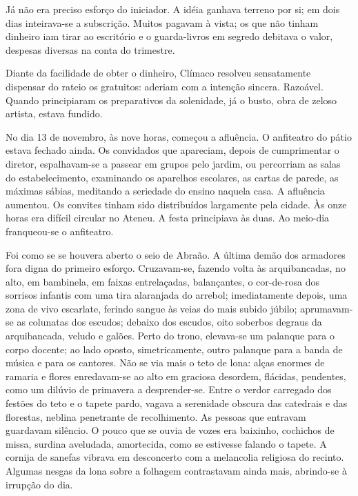 Já não era preciso esforço do
iniciador. A idéia ganhava terreno por si; em dois dias inteirava{}-se
a subscrição. Muitos pagavam à vista; os que não tinham dinheiro iam
tirar ao escritório e o guarda{}-livros em segredo debitava o valor,
despesas diversas na conta do trimestre. 

Diante da facilidade de obter
o dinheiro, Clímaco resolveu sensatamente dispensar do rateio os
gratuitos: aderiam com a intenção sincera. Razoável. Quando
principiaram os preparativos da solenidade, já o busto, obra de zeloso
artista, estava fundido. 

No dia 13 de novembro, às nove horas, começou
a afluência. O anfiteatro do pátio estava fechado ainda. Os convidados
que apareciam, depois de cumprimentar o diretor, espalhavam{}-se a
passear em grupos pelo jardim, ou percorriam as salas do
estabelecimento, examinando os aparelhos escolares, as cartas de
parede, as máximas sábias, meditando a seriedade do ensino naquela
casa. A afluência aumentou. Os convites tinham sido distribuídos
largamente pela cidade. Às onze horas era difícil circular no Ateneu. 
A festa principiava às duas. Ao meio{}-dia franqueou{}-se o anfiteatro.

Foi como se se houvera aberto o seio de Abraão. A última demão dos
armadores fora digna do primeiro esforço. Cruzavam{}-se, fazendo volta
às arquibancadas, no alto, em bambinela, em faixas entrelaçadas,
balançantes, o cor{}-de{}-rosa dos sorrisos infantis com uma tira
alaranjada do arrebol; imediatamente depois, uma zona de vivo
escarlate, ferindo sangue às veias do mais subido júbilo;
aprumavam{}-se as colunatas dos escudos; debaixo dos escudos, oito
soberbos degraus da arquibancada, veludo e galões. Perto do trono,
elevava{}-se um palanque para o corpo docente; ao lado oposto,
simetricamente, outro palanque para a banda de música e para os
cantores. Não se via mais o teto de lona: alças enormes de ramaria e
flores enredavam{}-se ao alto em graciosa desordem, flácidas,
pendentes, como um dilúvio de primavera a desprender{}-se. Entre o
verdor carregado dos festões do teto e o tapete pardo, vagava a
serenidade obscura das catedrais e das florestas, neblina penetrante de
recolhimento. As pessoas que entravam guardavam silêncio. O pouco que
se ouvia de vozes era baixinho, cochichos de missa, surdina aveludada,
amortecida, como se estivesse falando o tapete. A cornija de sanefas
vibrava em desconcerto com a melancolia religiosa do recinto. Algumas
nesgas da lona sobre a folhagem contrastavam ainda mais, abrindo{}-se à
irrupção do dia. 

